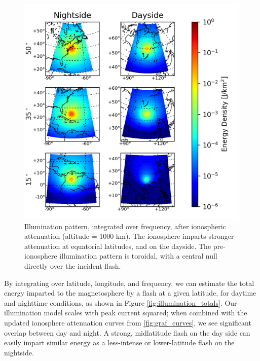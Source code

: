 \begin{figure}[h!]
\begin{center}
\includegraphics{figures/illumination_basemap.png}
\caption[Illumination pattern above the ionosphere]{Illumination pattern, integrated over frequency, after ionospheric attenuation (altitude = 1000 km). The ionosphere imparts stronger attenuation at equatorial latitudes, and on the dayside. The pre-ionosphere illumination pattern is toroidal, with a central null directly over the incident flash.}
\label{fig:illumination}
\end{center}
\end{figure}

By integrating over latitude, longitude, and frequency, we can estimate the total energy imparted to the magnetosphere by a flash at a given latitude, for daytime and nighttime conditions, as shown in Figure \ref{fig:illumination_totals}. Our illumination model scales with peak current squared; when combined with the updated ionosphere attenuation curves from \ref{fig:graf_curves}, we see significant overlap between day and night. A strong, midlatitude flash on the day side can easily impart similar energy as a less-intense or lower-latitude flash on the nightside.

